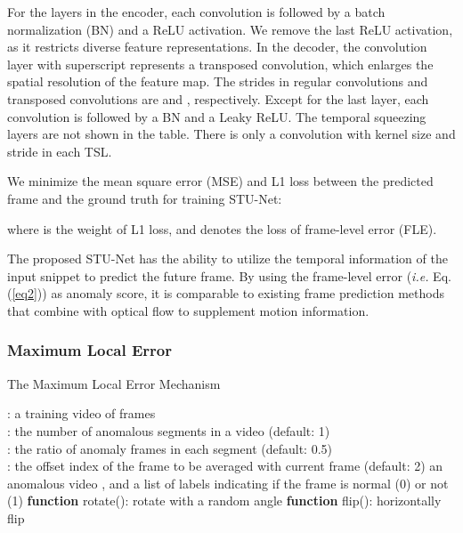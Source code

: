 \documentclass[lettersize,journal]{IEEEtran}
\begin{document}
For the layers in the encoder, each convolution is followed by a batch normalization (BN) \cite{BatchNormalization2015ioffe} and a ReLU activation.
We remove the last ReLU activation, as it restricts diverse feature representations.
In the decoder, the convolution layer with superscript  represents a transposed convolution, which enlarges the spatial resolution of the feature map.
The strides in regular convolutions and transposed convolutions are  and , respectively.
Except for the last layer, each convolution is followed by a BN and a Leaky ReLU.
The temporal squeezing layers are not shown in the table. There is only a convolution with kernel size  and stride  in each TSL.

We minimize the mean square error (MSE) and L1 loss between the predicted frame  and the ground truth  for training STU-Net:


where  is the weight of L1 loss, and  denotes the loss of frame-level error (FLE).

The proposed STU-Net has the ability to utilize the temporal information of the input snippet to predict the future frame.
By using the frame-level error (\textit{i.e.} Eq. (\ref{eq2})) as anomaly score, it is comparable to existing frame prediction methods that combine with optical flow to supplement motion information.

\subsubsection{Maximum Local Error}
\begin{algorithm}[!t]
	\caption{The Maximum Local Error Mechanism}
	\begin{algorithmic}
		\Require : a training video of  frames \\
		\quad : the number of anomalous segments in a video (default: 1) \\
		\quad : the ratio of anomaly frames in each segment (default: 0.5) \\
		\quad : the offset index of the frame to be averaged with current frame (default: 2)
		\Ensure an anomalous video , and a list of labels  indicating if the frame is normal (0) or not (1)
		\State \textbf{function} rotate(): rotate  with a random angle 
		\State \textbf{function} flip(): horizontally flip 
		\State  {}
			\State  {}
			\State 
			\State 
			\State 
				\State 
				\State 
				\State 
			\Else
				\State 
			\EndIf
		\EndFor

		
	\end{algorithmic} 
	\label{alg1}
\end{algorithm}
\end{document}
